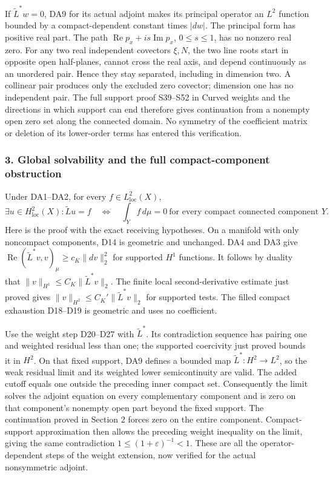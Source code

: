\documentclass[
  11pt,
]{article}
\begin{document}
If \(\widetilde L^*w=0\), DA9 for its actual adjoint makes its principal
operator an \(L^2\) function bounded by a compact-dependent constant
times \(|dw|\). The principal form has positive real part. The path
\(\operatorname{Re}p_x+is\operatorname{Im}p_x\), \(0\leq s\leq1\), has
no nonzero real zero. For any two real independent covectors \(\xi,N\),
the two line roots start in opposite open half-planes, cannot cross the
real axis, and depend continuously as an unordered pair. Hence they stay
separated, including in dimension two. A collinear pair produces only
the excluded zero covector; dimension one has no independent pair. The
full support proof S39--S52 in Curved weights and the directions in
which support can end therefore gives continuation from a nonempty open
zero set along the connected domain. No symmetry of the coefficient
matrix or deletion of its lower-order terms has entered this
verification.

\subsubsection{3. Global solvability and the full compact-component
obstruction}\label{global-solvability-and-the-full-compact-component-obstruction}

Under DA1--DA2, for every \(f\in L^2_{\mathrm{loc}}(X)\), \[
 \exists u\in H^2_{\mathrm{loc}}(X):\widetilde Lu=f
 \quad\Longleftrightarrow\quad
 \int_Y f\,d\mu=0\ \text{for every compact connected component }Y.
 \tag{DA10}
\] Here is the proof with the exact receiving hypotheses. On a manifold
with only noncompact components, D14 is geometric and unchanged. DA4 and
DA3 give \(\operatorname{Re}(\widetilde L^*v,v)_\mu\geq c_K\|dv\|_2^2\)
for supported \(H^1\) functions. It follows by duality that
\(\|v\|_{H^1}\leq C_K\|\widetilde L^*v\|_2\). The finite local
second-derivative estimate just proved gives
\(\|v\|_{H^2}\leq C_K'\|\widetilde L^*v\|_2\) for supported tests. The
filled compact exhaustion D18--D19 is geometric and uses no coefficient.

Use the weight step D20--D27 with \(\widetilde L^*\). Its contradiction
sequence has pairing one and weighted residual less than one; the
supported coercivity just proved bounds it in \(H^2\). On that fixed
support, DA9 defines a bounded map \(\widetilde L^*:H^2\to L^2\), so the
weak residual limit and its weighted lower semicontinuity are valid. The
added cutoff equals one outside the preceding inner compact set.
Consequently the limit solves the adjoint equation on every
complementary component and is zero on that component's nonempty open
part beyond the fixed support. The continuation proved in Section 2
forces zero on the entire component. Compact-support approximation then
allows the preceding weight inequality on the limit, giving the same
contradiction \(1\leq(1+\varepsilon)^{-1}<1\). These are all the
operator-dependent steps of the weight extension, now verified for the
actual nonsymmetric adjoint.
\end{document}
